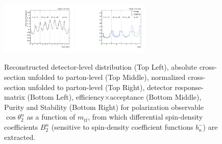 \begin{figure}[htb]
\begin{center}
 \includegraphics[width=0.32\textwidth]{fig_fullRun2UL/unfolding/combined/TotEff_b2n_mttbar.pdf}
 \includegraphics[width=0.32\textwidth]{fig_fullRun2UL/unfolding/combined/PurStab_b2n_mttbar.pdf} \\
\caption{Reconstructed detector-level distribution (Top Left), absolute cross-section unfolded to parton-level (Top Middle), normalized cross-section unfolded to parton-level (Top Right), detector response-matrix (Bottom Left), efficiency$\times$acceptance (Bottom Middle), Purity and Stability (Bottom Right) for polarization observable $\cos\theta_{2}^{n}$ as a function of $m_{t\bar{t}}$, from which differential spin-density coefficients $B_{2}^{n}$ (sensitive to spin-density coefficient functions $b_n^{-}$) are extracted.}
\label{fig:b2n_mttbar}
\end{center}
\end{figure}
\clearpage
